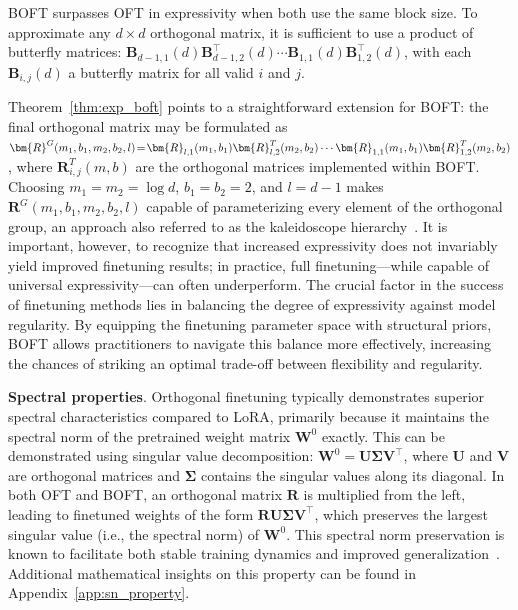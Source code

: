 \begin{theorem}\label{thm:exp_boft}
    BOFT surpasses OFT in expressivity when both use the same block size. To approximate any $d\times d$ orthogonal matrix, it is sufficient to use a product of butterfly matrices: $\bm{B}_{d-1,1}(d)\bm{B}^\top_{d-1,2}(d)\cdots\bm{B}_{1,1}(d)\bm{B}^\top_{1,2}(d)$, with each $\bm{B}_{i,j}(d)$ a butterfly matrix for all valid $i$ and $j$.
\end{theorem}

Theorem~\ref{thm:exp_boft} points to a straightforward extension for BOFT: the final orthogonal matrix may be formulated as $\thickmuskip=2mu \medmuskip=2mu \bm{R}^G(m_1,b_1,m_2,b_2,l)=\bm{R}_{l,1}(m_1,b_1)\bm{R}_{l,2}^T(m_2,b_2)\cdots\bm{R}_{1,1}(m_1,b_1)\bm{R}_{1,2}^T(m_2,b_2)$, where $\bm{R}_{i,j}^T(m,b)$ are the orthogonal matrices implemented within BOFT. Choosing $m_1=m_2=\log d$, $b_1=b_2=2$, and $l=d-1$ makes $\bm{R}^G(m_1,b_1,m_2,b_2,l)$ capable of parameterizing every element of the orthogonal group, an approach also referred to as the kaleidoscope hierarchy~\cite{dao2019kaleidoscope}. It is important, however, to recognize that increased expressivity does not invariably yield improved finetuning results; in practice, full finetuning—while capable of universal expressivity—can often underperform. The crucial factor in the success of finetuning methods lies in balancing the degree of expressivity against model regularity. By equipping the finetuning parameter space with structural priors, BOFT allows practitioners to navigate this balance more effectively, increasing the chances of striking an optimal trade-off between flexibility and regularity.

\textbf{Spectral properties}. Orthogonal finetuning typically demonstrates superior spectral characteristics compared to LoRA, primarily because it maintains the spectral norm of the pretrained weight matrix $\bm{W}^0$ exactly. This can be demonstrated using singular value decomposition: $\bm{W}^0=\bm{U}\bm{\Sigma}\bm{V}^\top$, where $\bm{U}$ and $\bm{V}$ are orthogonal matrices and $\bm{\Sigma}$ contains the singular values along its diagonal. In both OFT and BOFT, an orthogonal matrix $\bm{R}$ is multiplied from the left, leading to finetuned weights of the form $\bm{R}\bm{U}\bm{\Sigma}\bm{V}^\top$, which preserves the largest singular value (i.e., the spectral norm) of $\bm{W}^0$. This spectral norm preservation is known to facilitate both stable training dynamics and improved generalization~\cite{miyato2018spectral,yoshida2017spectral}. Additional mathematical insights on this property can be found in Appendix~\ref{app:sn_property}.

